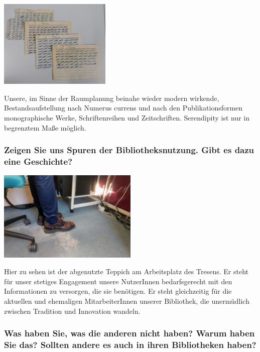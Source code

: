\begin{center}
\includegraphics[width=0.4\textwidth]{zalf/img/nc-aufstellung.jpg}
\end{center}

Unsere, im Sinne der Raumplanung beinahe wieder modern wirkende,
Bestandsaufstellung nach Numerus currens und nach den Publikationsformen
monographische Werke, Schriftenreihen und Zeitschriften. Serendipity ist
nur in begrenztem Maße möglich.

\hypertarget{zeigen-sie-uns-spuren-der-bibliotheksnutzung.-gibt-es-dazu-eine-geschichte}{%
\subsubsection*{Zeigen Sie uns Spuren der Bibliotheksnutzung. Gibt es dazu eine
Geschichte?}\label{zeigen-sie-uns-spuren-der-bibliotheksnutzung.-gibt-es-dazu-eine-geschichte}}

\begin{center}
\includegraphics[width=0.5\textwidth]{zalf/img/teppich.jpg}
\end{center}

Hier zu sehen ist der abgenutzte Teppich am Arbeitsplatz des Tresens. Er
steht für unser stetiges Engagement unsere NutzerInnen bedarfsgerecht
mit den Informationen zu versorgen, die sie benötigen. Er steht
gleichzeitig für die aktuellen und ehemaligen MitarbeiterInnen unserer
Bibliothek, die unermüdlich zwischen Tradition und Innovation wandeln.

\hypertarget{was-haben-sie-was-die-anderen-nicht-haben-warum-haben-sie-das-sollten-andere-es-auch-in-ihren-bibliotheken-haben}{%
\subsubsection*{Was haben Sie, was die anderen nicht haben? Warum haben Sie
das? Sollten andere es auch in ihren Bibliotheken
haben?}\label{was-haben-sie-was-die-anderen-nicht-haben-warum-haben-sie-das-sollten-andere-es-auch-in-ihren-bibliotheken-haben}}

